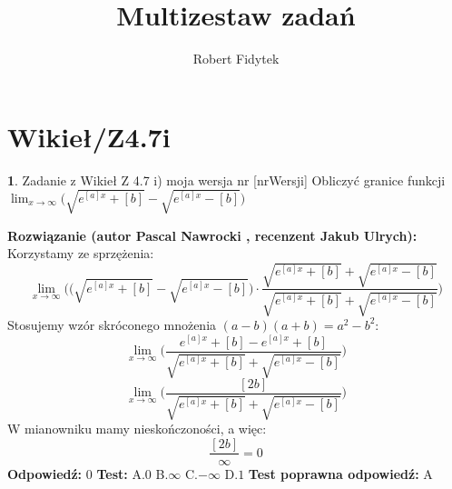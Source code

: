 \documentclass[12pt, a4paper]{article}
\title{Multizestaw zadań}
\author{Robert Fidytek}
\date{}
\theoremstyle{definition} %
\newtheorem{zad}{}
\newcommand{\kategoria}[1]{\section{#1}} %
\newcommand{\zadStart}[1]{\begin{zad}#1\newline} %
\newcommand{\zadStop}{\end{zad}}   %
\newcommand{\rozwStart}[2]{\noindent \textbf{Rozwiązanie (autor #1 , recenzent #2): }\newline} %
\newcommand{\rozwStop}{\newline}                                            %
\newcommand{\odpStart}{\noindent \textbf{Odpowiedź:}\newline}    %
\newcommand{\odpStop}{\newline}                                             %
\newcommand{\testStart}{\noindent \textbf{Test:}\newline} %
\newcommand{\testStop}{\newline} %
\newcommand{\kluczStart}{\noindent \textbf{Test poprawna odpowiedź:}\newline} %
\newcommand{\kluczStop}{\newline} %
\begin{document}
\maketitle


\kategoria{Wikieł/Z4.7i}
\zadStart{Zadanie z Wikieł Z 4.7 i) moja wersja nr [nrWersji]}
Obliczyć granice funkcji $\displaystyle{\lim_{x \to \infty}}\big(\sqrt{e^{[a]x}+[b]}-\sqrt{e^{[a]x}-[b]}\big)$
\zadStop
\rozwStart{Pascal Nawrocki}{Jakub Ulrych}
Korzystamy ze sprzężenia:
$$\displaystyle{\lim_{x \to \infty}}\bigg(\big(\sqrt{e^{[a]x}+[b]}-\sqrt{e^{[a]x}-[b]}\big)\cdot\frac{\sqrt{e^{[a]x}+[b]}+\sqrt{e^{[a]x}-[b]}}{\sqrt{e^{[a]x}+[b]}+\sqrt{e^{[a]x}-[b]}}\bigg)$$
Stosujemy wzór skróconego mnożenia $(a-b)(a+b)=a^2-b^2$:
$$\displaystyle{\lim_{x \to \infty}}\big(\frac{e^{[a]x}+[b]-e^{[a]x}+[b]}{\sqrt{e^{[a]x}+[b]}+\sqrt{e^{[a]x}-[b]}}\big)$$
$$\displaystyle{\lim_{x \to \infty}}\big(\frac{[2b]}{\sqrt{e^{[a]x}+[b]}+\sqrt{e^{[a]x}-[b]}}\big)$$
W mianowniku mamy nieskończoności, a więc:
$$\frac{[2b]}{\infty}=0$$
\rozwStop
\odpStart
$0$
\odpStop
\testStart
A.$0$
B.$\infty$
C.$-\infty$
D.$1$
\testStop
\kluczStart
A
\kluczStop
\end{document}
